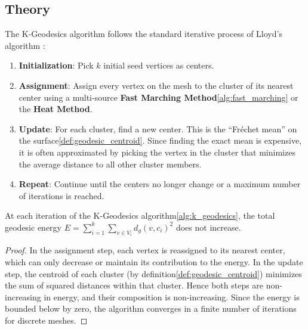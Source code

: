 \subsection{Theory}
The K-Geodesics algorithm follows the standard iterative process of Lloyd's algorithm \cite{lloyd1982}:
\begin{enumerate}
  \item \textbf{Initialization}: Pick $k$ initial seed vertices as centers.
  \item \textbf{Assignment}: Assign every vertex on the mesh to the cluster of its nearest center using a multi-source \textbf{Fast Marching Method}\cref{alg:fast_marching} or the \textbf{Heat Method}.
  \item \textbf{Update}: For each cluster, find a new center. This is the ``Fr\'{e}chet mean'' on the surface\cref{def:geodesic_centroid}. Since finding the exact mean is expensive, it is often approximated by picking the vertex in the cluster that minimizes the average distance to all other cluster members.
  \item \textbf{Repeat}: Continue until the centers no longer change or a maximum number of iterations is reached.
\end{enumerate}

\begin{theorem}\label{thm:k_geodesics_energy}
At each iteration of the K-Geodesics algorithm\cref{alg:k_geodesics}, the total geodesic energy $E = \sum_{i=1}^{k} \sum_{v \in V_i} d_g(v, c_i)^2$ does not increase.
\end{theorem}
\begin{proof}
In the assignment step, each vertex is reassigned to its nearest center, which can only decrease or maintain its contribution to the energy. In the update step, the centroid of each cluster (by definition\cref{def:geodesic_centroid}) minimizes the sum of squared distances within that cluster. Hence both steps are non-increasing in energy, and their composition is non-increasing. Since the energy is bounded below by zero, the algorithm converges in a finite number of iterations for discrete meshes.
\end{proof}


